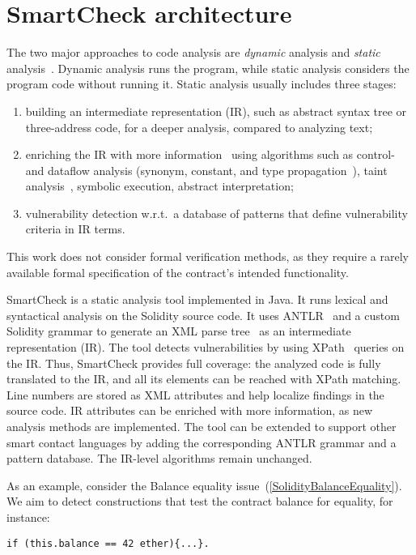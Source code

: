 \section{SmartCheck architecture}

The two major approaches to code analysis are \textit{dynamic} analysis and \textit{static} analysis~\cite{Liu2012}.
Dynamic analysis runs the program, while static analysis considers the program code without running it.
Static analysis usually includes three stages:
\begin{enumerate}
	\item building an intermediate representation (IR), such as abstract syntax tree or three-address code, for a deeper analysis, compared to analyzing text;
	\item enriching the IR with more information~\cite{Woegerer2005} using algorithms such as control- and dataflow analysis (synonym, constant, and type propagation~\cite{Aho1986}), taint analysis~\cite{Tripp2009}, symbolic execution, abstract interpretation;
	\item vulnerability detection w.r.t.~a database of patterns that define vulnerability criteria in IR terms.
\end{enumerate}
This work does not consider formal verification methods, as they require a rarely available formal specification of the contract's intended functionality.

SmartCheck is a static analysis tool implemented in Java.
It runs lexical and syntactical analysis on the Solidity source code.
It uses ANTLR~\cite{Parr} and a custom Solidity grammar to generate an XML parse tree~\cite{Aho1986} as an intermediate representation (IR).
The tool detects vulnerabilities by using XPath~\cite{Liu2009} queries on the IR\@.
Thus, SmartCheck provides full coverage: the analyzed code is fully translated to the IR, and all its elements can be reached with XPath matching.
Line numbers are stored as XML attributes and help localize findings in the source code.
IR attributes can be enriched with more information, as new analysis methods are implemented.
The tool can be extended to support other smart contact languages by adding the corresponding ANTLR grammar and a pattern database.
The IR-level algorithms remain unchanged.

As an example, consider the Balance equality issue~(\ref{SolidityBalanceEquality}).
We aim to detect constructions that test the contract balance for equality, for instance:

\begin{minipage}{\linewidth}
\begin{lstlisting}[language=Solidity]
if (this.balance == 42 ether){...}.
\end{lstlisting}
\end{minipage}

